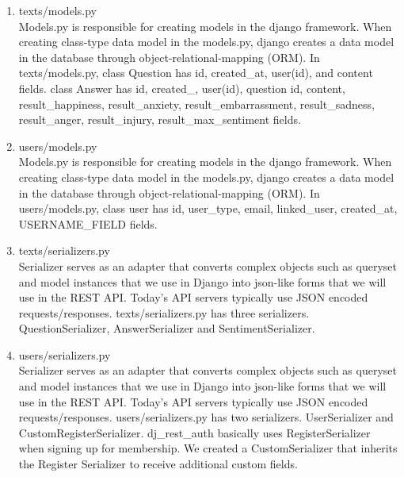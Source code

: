 \documentclass[conference]{IEEEtran}
\begin{document}
\begin{enumerate}
\begin{enumerate}
\begin{enumerate}
            \item texts/models.py
            \\Models.py is responsible for creating models in the django framework. When creating class-type data model in the models.py, django creates a data model in the database through object-relational-mapping (ORM). In texts/models.py, class Question has id, created\_at, user(id), and content fields. class Answer has id, created\_, user(id), question id, content, result\_happiness, result\_anxiety, result\_embarrassment, result\_sadness, result\_anger, result\_injury, result\_max\_sentiment fields.
            \item users/models.py
            \\Models.py is responsible for creating models in the django framework. When creating class-type data model in the models.py, django creates a data model in the database through object-relational-mapping (ORM). In users/models.py, class user has id, user\_type, email, linked\_user, created\_at, USERNAME\_FIELD fields.

            \item texts/serializers.py
            \\Serializer serves as an adapter that converts complex objects such as queryset and model instances that we use in Django into json-like forms that we will use in the REST API. Today's API servers typically use JSON encoded requests/responses. texts/serializers.py has three serializers. QuestionSerializer, AnswerSerializer and SentimentSerializer.
            \item users/serializers.py
            \\Serializer serves as an adapter that converts complex objects such as queryset and model instances that we use in Django into json-like forms that we will use in the REST API. Today's API servers typically use JSON encoded requests/responses. users/serializers.py has two serializers. UserSerializer and CustomRegisterSerializer. dj\_rest\_auth basically uses RegisterSerializer when signing up for membership. We created a CustomSerializer that inherits the Register Serializer to receive additional custom fields.
            

\end{enumerate}
\end{enumerate}
\end{enumerate}
\end{document}
